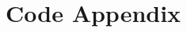 \renewcommand\thesection{\Alph{section}}
\setcounter{section}{0}
\section{Code Appendix}

\onehalfspacing
\linespread{1}

\clearpage

